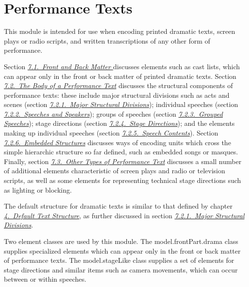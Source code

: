 
\section[{Performance Texts}]{Performance Texts}\label{DR}\par
This module is intended for use when encoding printed dramatic texts, screen plays or radio scripts, and written transcriptions of any other form of performance. \par
Section \textit{\hyperref[DRFAB]{7.1.\ Front and Back Matter }} discusses elements such as cast lists, which can appear only in the front or back matter of printed dramatic texts. Section \textit{\hyperref[DRBOD]{7.2.\ The Body of a Performance Text}} discusses the structural components of performance texts: these include major structural divisions such as acts and scenes (section \textit{\hyperref[DRDIV]{7.2.1.\ Major Structural Divisions}}); individual speeches (section \textit{\hyperref[DRSP]{7.2.2.\ Speeches and Speakers}}); groups of speeches (section \textit{\hyperref[DRSPG]{7.2.3.\ Grouped Speeches}}); stage directions (section \textit{\hyperref[DRSTA]{7.2.4.\ Stage Directions}}); and the elements making up individual speeches (section \textit{\hyperref[DRPAL]{7.2.5.\ Speech Contents}}). Section \textit{\hyperref[DREMB]{7.2.6.\ Embedded Structures}} discusses ways of encoding units which cross the simple hierarchic structure so far defined, such as embedded songs or masques. Finally, section \textit{\hyperref[DROTH]{7.3.\ Other Types of Performance Text}} discusses a small number of additional elements characteristic of screen plays and radio or television scripts, as well as some elements for representing technical stage directions such as lighting or blocking.\par
The default structure for dramatic texts is similar to that defined by chapter \textit{\hyperref[DS]{4.\ Default Text Structure}}, as further discussed in section \textit{\hyperref[DRDIV]{7.2.1.\ Major Structural Divisions}}.\par
Two element classes are used by this module. The \textsf{model.frontPart.drama} class supplies specialized elements which can appear only in the front or back matter of performance texts. The \textsf{model.stageLike} class supplies a set of elements for stage directions and similar items such as camera movements, which can occur between or within speeches.

